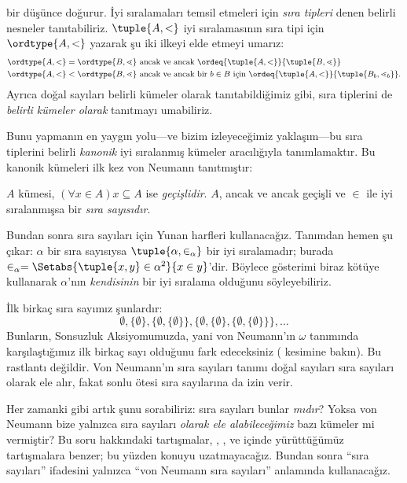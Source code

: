 


 bir düşünce doğurur.
İyi sıralamaları temsil etmeleri için \emph{sıra tipleri} denen belirli
nesneler tanıtabiliriz. $\tuple{A,<}$ iyi sıralamasının sıra tipi için
$\ordtype{A,<}$ yazarak şu iki ilkeyi elde etmeyi umarız:
\begin{align*}
	\ordtype{A, <} = \ordtype{B, \lessdot} &
	\text{ ancak ve ancak } \ordeq{\tuple{A, <}}{\tuple{B, \lessdot}}\\
	\ordtype{A, <} < \ordtype{B, \lessdot}&
	\text{ ancak ve ancak bir }b \in B\text{ için }
	\ordeq{\tuple{A, <}}{\tuple{B_b, \lessdot_b}}.
\end{align*}
Ayrıca doğal sayıları belirli kümeler olarak tanıtabildiğimiz gibi, sıra
tiplerini de \emph{belirli kümeler olarak} tanıtmayı umabiliriz.

Bunu yapmanın en yaygın yolu---ve bizim izleyeceğimiz yaklaşım---bu sıra
tiplerini belirli \emph{kanonik} iyi sıralanmış kümeler aracılığıyla
tanımlamaktır. Bu kanonik kümeleri ilk kez von Neumann tanıtmıştır:

\begin{defn}
$A$ kümesi, $(\forall x\in A)x\subseteq A$ ise \emph{geçişlidir}.
$A$, ancak ve ancak geçişli ve $\in$ ile iyi sıralanmışsa bir
\emph{sıra sayısıdır}.
\end{defn}
\noindent
Bundan sonra sıra sayıları için Yunan harfleri kullanacağız. Tanımdan
hemen şu çıkar: $\alpha$ bir sıra sayısıysa
$\tuple{\alpha,\in_\alpha}$ bir iyi sıralamadır; burada
$\in_\alpha=\Setabs{\tuple{x,y}\in\alpha^2}{x\in y}$'dir. Böylece
gösterimi biraz kötüye kullanarak $\alpha$'nın \emph{kendisinin} bir iyi
sıralama olduğunu söyleyebiliriz.

İlk birkaç sıra sayımız şunlardır:
\[
	\emptyset, \{\emptyset\},
	\{\emptyset, \{\emptyset\}\},
	\{\emptyset, \{\emptyset\}, \{\emptyset, \{\emptyset\}\}\}, \ldots
\]
Bunların, Sonsuzluk Aksiyomumuzda, yani von Neumann'ın $\omega$ tanımında
karşılaştığımız ilk birkaç sayı olduğunu fark edeceksiniz
( kesimine bakın). Bu rastlantı değildir.
Von Neumann'ın sıra sayıları tanımı doğal sayıları sıra sayıları olarak ele
alır, fakat sonlu ötesi sıra sayılarına da izin verir.

Her zamanki gibi artık şunu sorabiliriz: sıra sayıları bunlar \emph{mıdır}?
Yoksa von Neumann bize yalnızca sıra sayıları \emph{olarak ele
alabileceğimiz} bazı kümeler mi vermiştir? Bu soru hakkındaki tartışmalar,
, ,
 ve
 içinde yürüttüğümüz tartışmalara benzer; bu yüzden
konuyu uzatmayacağız. Bundan sonra ``sıra sayıları'' ifadesini yalnızca
``von Neumann sıra sayıları'' anlamında kullanacağız.

